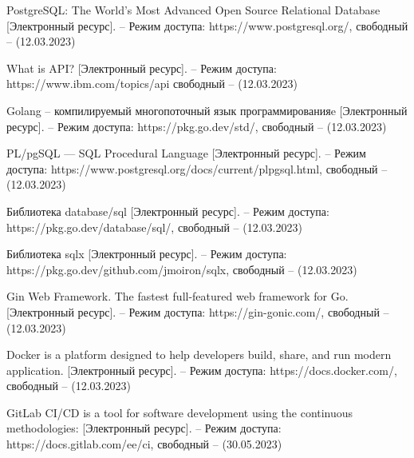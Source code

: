 \begin{thebibliography}{}
		PostgreSQL: The World's Most Advanced Open Source Relational Database  [Электронный ресурс]. -- Режим доступа: https://www.postgresql.org/,
		свободный -- (12.03.2023)
		
		
		What is API?  [Электронный ресурс]. -- Режим доступа: https://www.ibm.com/topics/api свободный -- (12.03.2023)
		 
		
		Golang -- компилируемый многопоточный язык программированияe  [Электронный ресурс]. -- Режим доступа: https://pkg.go.dev/std/, свободный -- (12.03.2023)
		
		PL/pgSQL — SQL Procedural Language [Электронный ресурс]. -- Режим доступа: https://www.postgresql.org/docs/current/plpgsql.html, свободный -- (12.03.2023)
		
		
		Библиотека database/sql [Электронный ресурс]. -- Режим доступа: https://pkg.go.dev/database/sql/,
		свободный -- (12.03.2023)
		
		Библиотека sqlx [Электронный ресурс]. -- Режим доступа: https://pkg.go.dev/github.com/jmoiron/sqlx,
		свободный -- (12.03.2023)
		
		Gin Web Framework. The fastest full-featured web framework for Go. [Электронный ресурс]. -- Режим доступа: https://gin-gonic.com/, свободный -- (12.03.2023)
		
		
		Docker is a platform designed to help developers build, share, and run modern application. [Электронный ресурс]. -- Режим доступа: https://docs.docker.com/, свободный -- (12.03.2023)
		
		
		GitLab CI/CD is a tool for software development using the continuous methodologies: [Электронный ресурс]. -- Режим доступа: https://docs.gitlab.com/ee/ci,  свободный -- (30.05.2023)
	
	

\end{thebibliography}
\endgroup

\pagebreak